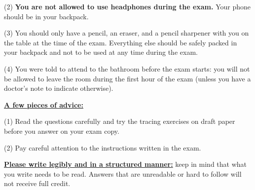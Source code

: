 \documentclass[11pt, oneside]{article}   	%
\begin{document}
(2) \textbf{You are not allowed to use headphones during the exam.} Your phone should be in your backpack.

(3) You should only have a pencil, an eraser, and a pencil sharpener with you on the table at the time of the exam. 
Everything else should be safely packed in your backpack and not to be used at any time during the exam.

(4) You were told to attend to the bathroom before the exam starts: 
you will not be allowed to leave the room during the first hour of the exam (unless you have a doctor’s note to indicate otherwise).

\textbf{\underline{A few pieces of advice:}}

(1) Read the questions carefully and try the tracing exercises on draft paper before you answer on your exam copy.

(2) Pay careful attention to the instructions written in the exam.

\textbf{\underline{Please write legibly and in a structured manner:}} 
keep in mind that what you write needs to be read. Answers that are unreadable or hard to follow will not receive full credit.
\end{document}
